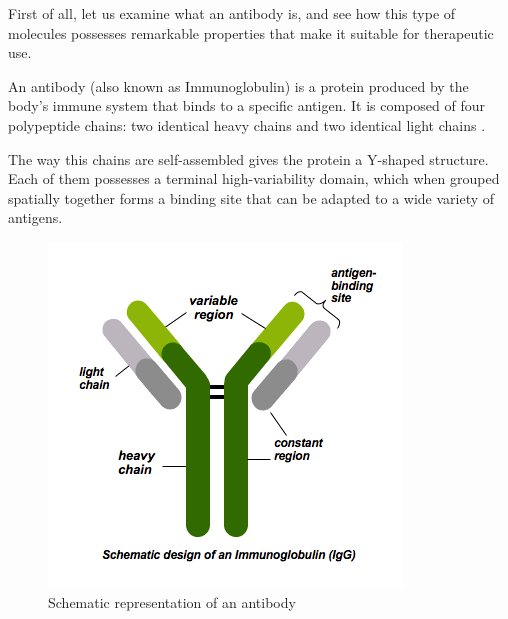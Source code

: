First of all, let us examine what an antibody is, and see how this
type of molecules possesses remarkable properties that make it suitable
for therapeutic use.

An antibody (also known as Immunoglobulin) is a protein produced by the 
body's immune system that binds to a specific antigen. It is composed of four
polypeptide chains: two identical heavy chains 
and two identical light chains \cite{davies_antibody_1993}. 

The way this chains are self-assembled gives the protein a Y-shaped structure. 
Each of them possesses a terminal high-variability domain, which when grouped spatially
together forms a binding site that can be adapted to a wide variety of antigens.

\begin{figure}[!h]
    \begin{minipage}{0.495\textwidth}
        \centering
        \includegraphics[width=\textwidth]{../Images/schematics_antibody.png}
        \caption{Schematic representation of an antibody} 
        \label{fig:schematics_antibody}
    \end{minipage}\hfill
    \begin{minipage}{0.495\textwidth}
        \centering

\end{minipage}
\end{figure}
